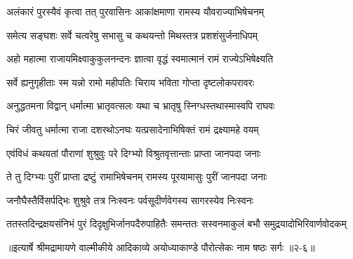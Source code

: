 \twolineshloka
{अलंकारं पुरस्यैवं कृत्वा तत् पुरवासिनः}
{आकांक्षमाणा रामस्य यौवराज्याभिषेचनम्} %

\twolineshloka
{समेत्य सङ्घशः सर्वे चत्वरेषु सभासु च}
{कथयन्तो मिथस्तत्र प्रशशंसुर्जनाधिपम्} %

\twolineshloka
{अहो महात्मा राजायमिक्ष्वाकुकुलनन्दनः}
{ज्ञात्वा वृद्धं स्वमात्मानं रामं राज्येऽभिषेक्ष्यति} %

\twolineshloka
{सर्वे ह्यनुगृहीताः स्म यन्नो रामो महीपतिः}
{चिराय भविता गोप्ता दृष्टलोकपरावरः} %

\twolineshloka
{अनुद्धतमना विद्वान् धर्मात्मा भ्रातृवत्सलः}
{यथा च भ्रातृषु स्निग्धस्तथास्मास्वपि राघवः} %

\twolineshloka
{चिरं जीवतु धर्मात्मा राजा दशरथोऽनघः}
{यत्प्रसादेनाभिषिक्तं रामं द्रक्ष्यामहे वयम्} %

\twolineshloka
{एवंविधं कथयतां पौराणां शुश्रुवुः परे}
{दिग्भ्यो विश्रुतवृत्तान्ताः प्राप्ता जानपदा जनाः} %

\twolineshloka
{ते तु दिग्भ्यः पुरीं प्राप्ता द्रष्टुं रामाभिषेचनम्}
{रामस्य पूरयामासुः पुरीं जानपदा जनाः} %

\twolineshloka
{जनौघैस्तैर्विसर्पद्भिः शुश्रुवे तत्र निःस्वनः}
{पर्वसूदीर्णवेगस्य सागरस्येव निःस्वनः} %

\twolineshloka
{ततस्तदिन्द्रक्षयसंनिभं पुरं दिदृक्षुभिर्जानपदैरुपाहितैः}
{समन्ततः सस्वनमाकुलं बभौ समुद्रयादोभिरिवार्णवोदकम्} %


॥इत्यार्षे श्रीमद्रामायणे वाल्मीकीये आदिकाव्ये अयोध्याकाण्डे पौरोत्सेकः नाम षष्ठः सर्गः ॥२-६॥
